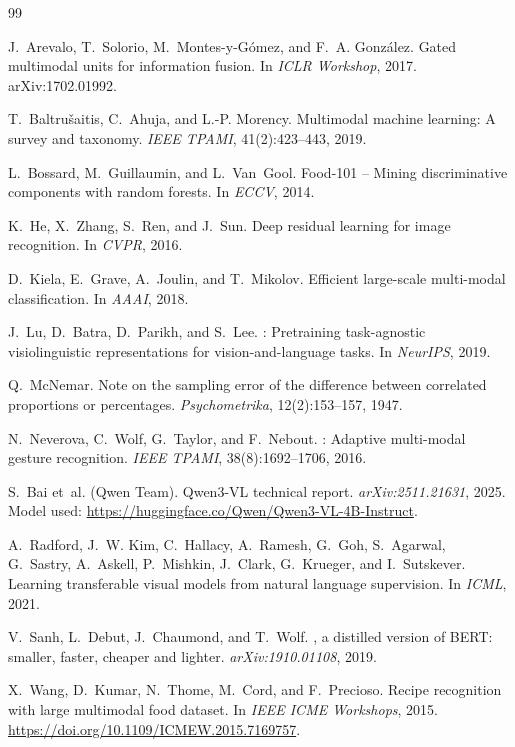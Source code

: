 \documentclass[11pt,a4paper]{article}
\begin{document}
\begin{thebibliography}{99}\small

J.~Arevalo, T.~Solorio, M.~Montes-y-G\'omez, and F.~A. Gonz\'alez.
\newblock Gated multimodal units for information fusion.
\newblock In \emph{ICLR Workshop}, 2017. arXiv:1702.01992.

T.~Baltru\v{s}aitis, C.~Ahuja, and L.-P. Morency.
\newblock Multimodal machine learning: A survey and taxonomy.
\newblock \emph{IEEE TPAMI}, 41(2):423--443, 2019.

L.~Bossard, M.~Guillaumin, and L.~Van~Gool.
\newblock Food-101 -- Mining discriminative components with random forests.
\newblock In \emph{ECCV}, 2014.

K.~He, X.~Zhang, S.~Ren, and J.~Sun.
\newblock Deep residual learning for image recognition.
\newblock In \emph{CVPR}, 2016.

D.~Kiela, E.~Grave, A.~Joulin, and T.~Mikolov.
\newblock Efficient large-scale multi-modal classification.
\newblock In \emph{AAAI}, 2018.

J.~Lu, D.~Batra, D.~Parikh, and S.~Lee.
: Pretraining task-agnostic visiolinguistic representations for vision-and-language tasks.
\newblock In \emph{NeurIPS}, 2019.

Q.~McNemar.
\newblock Note on the sampling error of the difference between correlated proportions or percentages.
\newblock \emph{Psychometrika}, 12(2):153--157, 1947.

N.~Neverova, C.~Wolf, G.~Taylor, and F.~Nebout.
: Adaptive multi-modal gesture recognition.
\newblock \emph{IEEE TPAMI}, 38(8):1692--1706, 2016.

S.~Bai et~al. (Qwen Team).
\newblock Qwen3-VL technical report.
\newblock \emph{arXiv:2511.21631}, 2025. Model used: \url{https://huggingface.co/Qwen/Qwen3-VL-4B-Instruct}.

A.~Radford, J.~W. Kim, C.~Hallacy, A.~Ramesh, G.~Goh, S.~Agarwal, G.~Sastry, A.~Askell, P.~Mishkin, J.~Clark,
G.~Krueger, and I.~Sutskever.
\newblock Learning transferable visual models from natural language supervision.
\newblock In \emph{ICML}, 2021.

V.~Sanh, L.~Debut, J.~Chaumond, and T.~Wolf.
, a distilled version of {BERT}: smaller, faster, cheaper and lighter.
\newblock \emph{arXiv:1910.01108}, 2019.

X.~Wang, D.~Kumar, N.~Thome, M.~Cord, and F.~Precioso.
\newblock Recipe recognition with large multimodal food dataset.
\newblock In \emph{IEEE ICME Workshops}, 2015.
\newblock \url{https://doi.org/10.1109/ICMEW.2015.7169757}.

\end{thebibliography}
\end{document}
